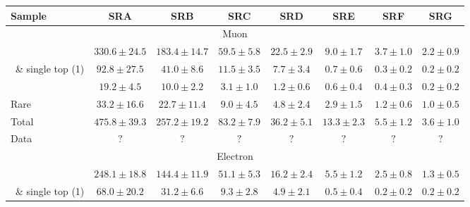 																																
																																
																																
																																
	\begin{table}[!h]																															
	\begin{center}																															
	{\footnotesize																															
	\begin{tabular}{l||c|c|c|c|c|c|c}																															
	\hline																															
	Sample		&	SRA			&	SRB			&	SRC			&	SRD			&	SRE			&	SRF			&	SRG\\				
	\hline																															
	\hline																															
	\multicolumn{8}{c}{Muon}	\\																														
	\hline																															
	\ttdl\  		&$	330.6	\pm	24.5	$&$	183.4	\pm	14.7	$&$	59.5	\pm	5.8	$&$	22.5	\pm	2.9	$&$	9.0	\pm	1.7	$&$	3.7	\pm	1.0	$&$	2.2	\pm	0.9	$	\\
	\ttsl\ \& single top (1\Lep) 		&$	92.8	\pm	27.5	$&$	41.0	\pm	8.6	$&$	11.5	\pm	3.5	$&$	7.7	\pm	3.4	$&$	0.7	\pm	0.6	$&$	0.3	\pm	0.2	$&$	0.2	\pm	0.2	$	\\
	\wjets\ 		&$	19.2	\pm	4.5	$&$	10.0	\pm	2.2	$&$	3.1	\pm	1.0	$&$	1.2	\pm	0.6	$&$	0.6	\pm	0.4	$&$	0.4	\pm	0.3	$&$	0.2	\pm	0.2	$	\\
	Rare 		&$	33.2	\pm	16.6	$&$	22.7	\pm	11.4	$&$	9.0	\pm	4.5	$&$	4.8	\pm	2.4	$&$	2.9	\pm	1.5	$&$	1.2	\pm	0.6	$&$	1.0	\pm	0.5	$	\\
	\hline																															
	Total 		&$	475.8	\pm	39.3	$&$	257.2	\pm	19.2	$&$	83.2	\pm	7.9	$&$	36.2	\pm	5.1	$&$	13.3	\pm	2.3	$&$	5.5	\pm	1.2	$&$	3.6	\pm	1.0	$	\\
	\hline																															
	\hline																															
	Data 		&$	?			$&$	?			$&$	?			$&$	?			$&$	?			$&$	?			$&$	?			$	\\
	\hline																															
	\hline																															
	\hline																															
	\multicolumn{8}{c}{Electron}	\\																														
	\hline																															
	\ttdl\  		&$	248.1	\pm	18.8	$&$	144.4	\pm	11.9	$&$	51.1	\pm	5.3	$&$	16.2	\pm	2.4	$&$	5.5	\pm	1.2	$&$	2.5	\pm	0.8	$&$	1.3	\pm	0.5	$	\\
	\ttsl\ \& single top (1\Lep) 		&$	68.0	\pm	20.2	$&$	31.2	\pm	6.6	$&$	9.3	\pm	2.8	$&$	4.9	\pm	2.1	$&$	0.5	\pm	0.4	$&$	0.2	\pm	0.2	$&$	0.2	\pm	0.2	$	\\

\end{tabular}}
\end{center}
\end{table}
